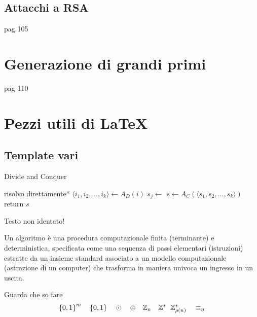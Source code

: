 \subsection{Attacchi a RSA}
pag 105

\section{Generazione di grandi primi}
pag 110

\section{Pezzi utili di \LaTeX{}}

\subsection{Template vari}

\begin{algorithm}[H]
\caption{Divide and Conquer}\label{alg:dnc}
\begin{algorithmic}[1]
            \State *risolvo direttamente*
        \EndIf
        \State $\langle i_1, i_2, \dots, i_k \rangle \gets A_D(i)$ 
            \State $s_j \gets $ 
        \EndFor
        \State $s \gets A_C(\langle s_1, s_2, \dots, s_k \rangle)$
        \State return $s$
    \EndProcedure
\end{algorithmic}
\end{algorithm}
\noindent
Testo non identato!

\begin{definition}[Algoritmo]\label{def:algex}
    Un algoritmo è una procedura computazionale finita (terminante) e deterministica, specificata come una sequenza di passi elementari (istruzioni) estratte da un insieme standard associato a un modello computazionale (astrazione di un computer) che trasforma in maniera univoca un ingresso in un uscita.
\end{definition}

Guarda che so fare
\begin{equation*}
    \left\{0,1\right\}^{m}
    \quad
    \left\{0,1\right\}^{}
    \quad
    \odot
    \quad
    \oplus
    \quad
    \mathbb{Z}_{n}
    \quad
    \mathbb{Z}_{\quad}^{*}
    \mathbb{Z}_{\rho(n)}^{*}
    \quad
    \equiv_n
\end{equation*}

